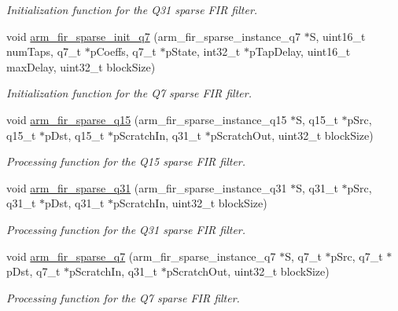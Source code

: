 \begin{DoxyCompactItemize}
\begin{DoxyCompactList}\small\item\em Initialization function for the Q31 sparse F\+IR filter. \end{DoxyCompactList}\item 
void \hyperlink{group__FIR__Sparse_ga98f5c1a097d4572ce4ff3b0c58ebcdbd}{arm\+\_\+fir\+\_\+sparse\+\_\+init\+\_\+q7} (arm\+\_\+fir\+\_\+sparse\+\_\+instance\+\_\+q7 $\ast$S, uint16\+\_\+t num\+Taps, q7\+\_\+t $\ast$p\+Coeffs, q7\+\_\+t $\ast$p\+State, int32\+\_\+t $\ast$p\+Tap\+Delay, uint16\+\_\+t max\+Delay, uint32\+\_\+t block\+Size)
\begin{DoxyCompactList}\small\item\em Initialization function for the Q7 sparse F\+IR filter. \end{DoxyCompactList}\item 
void \hyperlink{group__FIR__Sparse_ga2bffda2e156e72427e19276cd9c3d3cc}{arm\+\_\+fir\+\_\+sparse\+\_\+q15} (arm\+\_\+fir\+\_\+sparse\+\_\+instance\+\_\+q15 $\ast$S, q15\+\_\+t $\ast$p\+Src, q15\+\_\+t $\ast$p\+Dst, q15\+\_\+t $\ast$p\+Scratch\+In, q31\+\_\+t $\ast$p\+Scratch\+Out, uint32\+\_\+t block\+Size)
\begin{DoxyCompactList}\small\item\em Processing function for the Q15 sparse F\+IR filter. \end{DoxyCompactList}\item 
void \hyperlink{group__FIR__Sparse_ga03e9c2f0f35ad67d20bac66be9f920ec}{arm\+\_\+fir\+\_\+sparse\+\_\+q31} (arm\+\_\+fir\+\_\+sparse\+\_\+instance\+\_\+q31 $\ast$S, q31\+\_\+t $\ast$p\+Src, q31\+\_\+t $\ast$p\+Dst, q31\+\_\+t $\ast$p\+Scratch\+In, uint32\+\_\+t block\+Size)
\begin{DoxyCompactList}\small\item\em Processing function for the Q31 sparse F\+IR filter. \end{DoxyCompactList}\item 
void \hyperlink{group__FIR__Sparse_gae86c145efc2d9ec32dc6d8c1ad2ccb3c}{arm\+\_\+fir\+\_\+sparse\+\_\+q7} (arm\+\_\+fir\+\_\+sparse\+\_\+instance\+\_\+q7 $\ast$S, q7\+\_\+t $\ast$p\+Src, q7\+\_\+t $\ast$p\+Dst, q7\+\_\+t $\ast$p\+Scratch\+In, q31\+\_\+t $\ast$p\+Scratch\+Out, uint32\+\_\+t block\+Size)
\begin{DoxyCompactList}\small\item\em Processing function for the Q7 sparse F\+IR filter. \end{DoxyCompactList}\end{DoxyCompactItemize}


